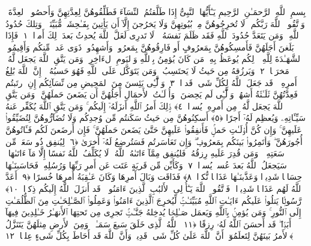 
  
    
  
    
    

\nopagebreak
  بِسمِ ٱللَّهِ ٱلرَّحمَـٰنِ ٱلرَّحِيمِ
  يَـٰٓأَيُّهَا ٱلنَّبِىُّ إِذَا طَلَّقتُمُ ٱلنِّسَآءَ فَطَلِّقُوهُنَّ لِعِدَّتِهِنَّ وَأَحصُوا۟ ٱلعِدَّةَ ۖ وَٱتَّقُوا۟ ٱللَّهَ رَبَّكُم ۖ لَا تُخرِجُوهُنَّ مِنۢ بُيُوتِهِنَّ وَلَا يَخرُجنَ إِلَّآ أَن يَأتِينَ بِفَـٰحِشَةٍۢ مُّبَيِّنَةٍۢ ۚ وَتِلكَ حُدُودُ ٱللَّهِ ۚ وَمَن يَتَعَدَّ حُدُودَ ٱللَّهِ فَقَد ظَلَمَ نَفسَهُۥ ۚ لَا تَدرِى لَعَلَّ ٱللَّهَ يُحدِثُ بَعدَ ذَٟلِكَ أَمرًۭا ﴿١﴾
 فَإِذَا بَلَغنَ أَجَلَهُنَّ فَأَمسِكُوهُنَّ بِمَعرُوفٍ أَو فَارِقُوهُنَّ بِمَعرُوفٍۢ وَأَشهِدُوا۟ ذَوَى عَدلٍۢ مِّنكُم وَأَقِيمُوا۟ ٱلشَّهَـٰدَةَ لِلَّهِ ۚ ذَٟلِكُم يُوعَظُ بِهِۦ مَن كَانَ يُؤمِنُ بِٱللَّهِ وَٱليَومِ ٱلءَاخِرِ ۚ وَمَن يَتَّقِ ٱللَّهَ يَجعَل لَّهُۥ مَخرَجًۭا ﴿٢﴾
 وَيَرزُقهُ مِن حَيثُ لَا يَحتَسِبُ ۚ وَمَن يَتَوَكَّل عَلَى ٱللَّهِ فَهُوَ حَسبُهُۥٓ ۚ إِنَّ ٱللَّهَ بَٰلِغُ أَمرِهِۦ ۚ قَد جَعَلَ ٱللَّهُ لِكُلِّ شَىءٍۢ قَدرًۭا ﴿٣﴾
 وَٱلَّٰٓـِٔى يَئِسنَ مِنَ ٱلمَحِيضِ مِن نِّسَآئِكُم إِنِ ٱرتَبتُم فَعِدَّتُهُنَّ ثَلَـٰثَةُ أَشهُرٍۢ وَٱلَّٰٓـِٔى لَم يَحِضنَ ۚ وَأُو۟لَـٰتُ ٱلأَحمَالِ أَجَلُهُنَّ أَن يَضَعنَ حَملَهُنَّ ۚ وَمَن يَتَّقِ ٱللَّهَ يَجعَل لَّهُۥ مِن أَمرِهِۦ يُسرًۭا ﴿٤﴾
 ذَٟلِكَ أَمرُ ٱللَّهِ أَنزَلَهُۥٓ إِلَيكُم ۚ وَمَن يَتَّقِ ٱللَّهَ يُكَفِّر عَنهُ سَيِّـَٔاتِهِۦ وَيُعظِم لَهُۥٓ أَجرًا ﴿٥﴾
 أَسكِنُوهُنَّ مِن حَيثُ سَكَنتُم مِّن وُجدِكُم وَلَا تُضَآرُّوهُنَّ لِتُضَيِّقُوا۟ عَلَيهِنَّ ۚ وَإِن كُنَّ أُو۟لَـٰتِ حَملٍۢ فَأَنفِقُوا۟ عَلَيهِنَّ حَتَّىٰ يَضَعنَ حَملَهُنَّ ۚ فَإِن أَرضَعنَ لَكُم فَـَٔاتُوهُنَّ أُجُورَهُنَّ ۖ وَأتَمِرُوا۟ بَينَكُم بِمَعرُوفٍۢ ۖ وَإِن تَعَاسَرتُم فَسَتُرضِعُ لَهُۥٓ أُخرَىٰ ﴿٦﴾
 لِيُنفِق ذُو سَعَةٍۢ مِّن سَعَتِهِۦ ۖ وَمَن قُدِرَ عَلَيهِ رِزقُهُۥ فَليُنفِق مِمَّآ ءَاتَىٰهُ ٱللَّهُ ۚ لَا يُكَلِّفُ ٱللَّهُ نَفسًا إِلَّا مَآ ءَاتَىٰهَا ۚ سَيَجعَلُ ٱللَّهُ بَعدَ عُسرٍۢ يُسرًۭا ﴿٧﴾
 وَكَأَيِّن مِّن قَريَةٍ عَتَت عَن أَمرِ رَبِّهَا وَرُسُلِهِۦ فَحَاسَبنَـٰهَا حِسَابًۭا شَدِيدًۭا وَعَذَّبنَـٰهَا عَذَابًۭا نُّكرًۭا ﴿٨﴾
 فَذَاقَت وَبَالَ أَمرِهَا وَكَانَ عَـٰقِبَةُ أَمرِهَا خُسرًا ﴿٩﴾
 أَعَدَّ ٱللَّهُ لَهُم عَذَابًۭا شَدِيدًۭا ۖ فَٱتَّقُوا۟ ٱللَّهَ يَـٰٓأُو۟لِى ٱلأَلبَٰبِ ٱلَّذِينَ ءَامَنُوا۟ ۚ قَد أَنزَلَ ٱللَّهُ إِلَيكُم ذِكرًۭا ﴿١٠﴾
 رَّسُولًۭا يَتلُوا۟ عَلَيكُم ءَايَـٰتِ ٱللَّهِ مُبَيِّنَـٰتٍۢ لِّيُخرِجَ ٱلَّذِينَ ءَامَنُوا۟ وَعَمِلُوا۟ ٱلصَّـٰلِحَـٰتِ مِنَ ٱلظُّلُمَـٰتِ إِلَى ٱلنُّورِ ۚ وَمَن يُؤمِنۢ بِٱللَّهِ وَيَعمَل صَـٰلِحًۭا يُدخِلهُ جَنَّـٰتٍۢ تَجرِى مِن تَحتِهَا ٱلأَنهَـٰرُ خَـٰلِدِينَ فِيهَآ أَبَدًۭا ۖ قَد أَحسَنَ ٱللَّهُ لَهُۥ رِزقًا ﴿١١﴾
 ٱللَّهُ ٱلَّذِى خَلَقَ سَبعَ سَمَـٰوَٟتٍۢ وَمِنَ ٱلأَرضِ مِثلَهُنَّ يَتَنَزَّلُ ٱلأَمرُ بَينَهُنَّ لِتَعلَمُوٓا۟ أَنَّ ٱللَّهَ عَلَىٰ كُلِّ شَىءٍۢ قَدِيرٌۭ وَأَنَّ ٱللَّهَ قَد أَحَاطَ بِكُلِّ شَىءٍ عِلمًۢا ﴿١٢﴾
 
